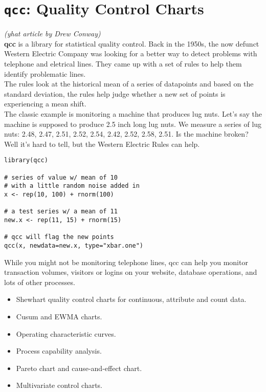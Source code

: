 \documentclass[12pt]{article}
\begin{document}
\section*{\texttt{qcc}: Quality Control Charts}
\textit{(yhat article by Drew Conway)}\\
\textbf{qcc} is a library for statistical quality control. Back in the 1950s, the now defunct Western Electric Company was looking for a better way to detect problems with telephone and eletrical lines. They came up with a set of rules to help them identify problematic lines. \\

\noindent The rules look at the historical mean of a series of datapoints and based on the standard deviation, the rules help judge whether a new set of points is experiencing a mean shift.\\

\noindent The classic example is monitoring a machine that produces lug nuts. Let's say the machine is supposed to produce 2.5 inch long lug nuts. We measure a series of lug nuts: 2.48, 2.47, 2.51, 2.52, 2.54, 2.42, 2.52, 2.58, 2.51. Is the machine broken? Well it's hard to tell, but the Western Electric Rules can help.
\begin{framed}
\begin{verbatim}
library(qcc)
 
# series of value w/ mean of 10 
# with a little random noise added in
x <- rep(10, 100) + rnorm(100)

# a test series w/ a mean of 11
new.x <- rep(11, 15) + rnorm(15)

# qcc will flag the new points
qcc(x, newdata=new.x, type="xbar.one")

\end{verbatim}
\end{framed}
While you might not be monitoring telephone lines, qcc can help you monitor transaction volumes, visitors or logins on your website, database operations, and lots of other processes.

\newpage
\begin{itemize}
\item Shewhart quality control charts for continuous, attribute and count data. 
\item Cusum and EWMA charts. 
\item Operating characteristic curves. 
\item Process capability analysis. 
\item Pareto chart and cause-and-effect chart. 
\item Multivariate control charts.
\end{itemize}
\end{document}
